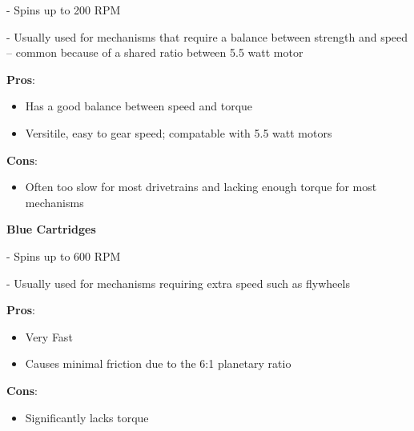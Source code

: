 - Spins up to 200 RPM

- Usually used for mechanisms that require a balance between strength and speed -- common because of a shared ratio between 5.5 watt motor

\noindent
\textbf{Pros}:
\begin{itemize}
    \item Has a good balance between speed and torque 
    \item Versitile, easy to gear speed; compatable with 5.5 watt motors
\end{itemize}
\textbf{Cons}:
\begin{itemize}
    \item Often too slow for most drivetrains and lacking enough torque for most mechanisms
\end{itemize}

\textbf{Blue Cartridges}

- Spins up to 600 RPM

- Usually used for mechanisms requiring extra speed such as flywheels

\noindent
\textbf{Pros}:
\begin{itemize}
    \item Very Fast
    \item Causes minimal friction due to the 6:1 planetary ratio
\end{itemize}
\textbf{Cons}:
\begin{itemize}
    \item Significantly lacks torque
\end{itemize}

